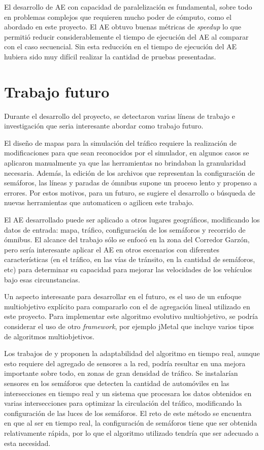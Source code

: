 El desarrollo de AE con capacidad de paralelización es fundamental, sobre todo en problemas complejos que requieren mucho poder de cómputo, como el abordado en este proyecto. El AE obtuvo buenas métricas de \emph{speedup} lo que permitió reducir considerablemente el tiempo de ejecución del AE al comparar con el caso secuencial. Sin esta reducción en el tiempo de ejecución del AE hubiera sido muy difícil realizar la cantidad de pruebas presentadas.

\section{Trabajo futuro}
Durante el desarrollo del proyecto, se detectaron varias líneas de trabajo e investigación que seria interesante abordar como trabajo futuro.

El diseño de mapas para la simulación del tráfico requiere la realización de modificaciones para que sean reconocidos por el simulador, en algunos casos se aplicaron manualmente ya que las herramientas no brindaban la granularidad necesaria. Además, la edición de los archivos que representan la configuración de semáforos, las líneas y paradas de ómnibus supone un proceso lento y propenso a errores. Por estos motivos, para un futuro, se sugiere el desarrollo o búsqueda de nuevas herramientas que automaticen o agilicen este trabajo.

El AE desarrollado puede ser aplicado a otros lugares geográficos, modificando  los datos de entrada: mapa, tráfico, configuración de los semáforos y recorrido de ómnibus. El alcance del trabajo sólo se enfocó en la zona del Corredor Garzón, pero sería interesante aplicar el AE en otros escenarios con diferentes características (en el tráfico, en las vías de tránsito, en la cantidad de semáforos, etc) para determinar su capacidad para mejorar las velocidades de los vehículos bajo esas circunstancias.

Un aspecto interesante para desarrollar en el futuro, es el uso de un enfoque multiobjetivo explícito para compararlo con el de agregación lineal utilizado en este proyecto. Para implementar este algoritmo evolutivo multiobjetivo, se podría considerar el uso de otro \emph{framework}, por ejemplo jMetal que incluye varios tipos de algoritmos multiobjetivos.

Los trabajos de  \citet{Montana1996} y \citet{Vogel2000} proponen la adaptabilidad del algoritmo en tiempo real, aunque esto requiere del agregado de sensores a la red, podría resultar en una mejora importante sobre todo, en zonas de gran densidad de tráfico. Se instalarían sensores en los semáforos que detecten la cantidad de automóviles en las intersecciones en tiempo real y un sistema que procesara los datos obtenidos en varias intersecciones para optimizar la circulación del tráfico, modificando la configuración de las luces de los semáforos. El reto de este método se encuentra en que al ser en tiempo real, la configuración de semáforos tiene que ser obtenida relativamente rápida, por lo que el algoritmo utilizado tendría que ser adecuado a esta necesidad.
